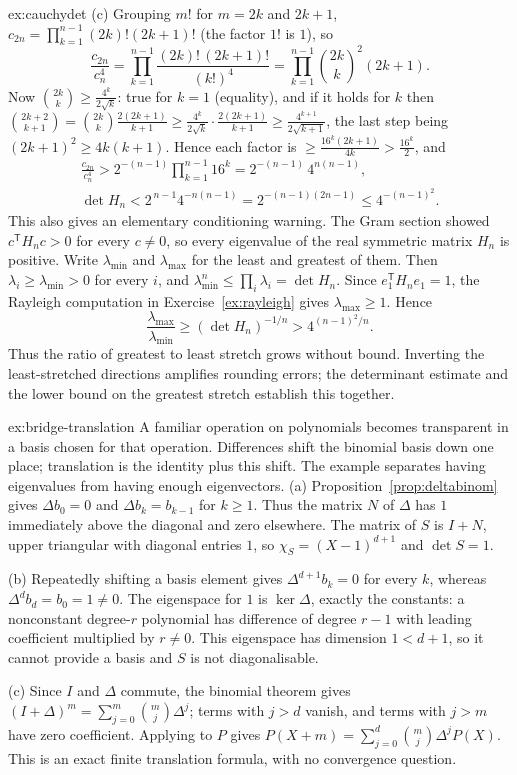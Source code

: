 \begin{solution}{ex:cauchydet}
(c) Grouping $m!$ for $m=2k$ and $2k+1$, $c_{2n}=\prod_{k=1}^{n-1}(2k)!(2k+1)!$ (the factor $1!$ is $1$), so
\[
\frac{c_{2n}}{c_n^4}=\prod_{k=1}^{n-1}\frac{(2k)!\,(2k+1)!}{(k!)^4}=\prod_{k=1}^{n-1}\binom{2k}k^2(2k+1).
\]
Now $\binom{2k}k\ge\frac{4^k}{2\sqrt k}$: true for $k=1$ (equality), and if it holds for $k$ then $\binom{2k+2}{k+1}=\binom{2k}k\frac{2(2k+1)}{k+1}\ge\frac{4^k}{2\sqrt k}\cdot\frac{2(2k+1)}{k+1}\ge\frac{4^{k+1}}{2\sqrt{k+1}}$, the last step being $(2k+1)^2\ge4k(k+1)$. Hence each factor is $\ge\frac{16^k(2k+1)}{4k}>\frac{16^k}2$, and
\[
\begin{gathered}
\frac{c_{2n}}{c_n^4}>2^{-(n-1)}\prod_{k=1}^{n-1}16^k=2^{-(n-1)}\,4^{n(n-1)},\\
\det H_n<2^{\,n-1}4^{-n(n-1)}=2^{-(n-1)(2n-1)}\le4^{-(n-1)^2}.
\end{gathered}
\]
This also gives an elementary conditioning warning. The Gram section showed $c^{\mathsf T}H_nc>0$ for every $c\ne0$, so every eigenvalue of the real symmetric matrix $H_n$ is positive. Write $\lambda_{\min}$ and $\lambda_{\max}$ for the least and greatest of them. Then $\lambda_i\ge\lambda_{\min}>0$ for every $i$, and $\lambda_{\min}^n\le\prod_i\lambda_i=\det H_n$. Since $e_1^{\mathsf T}H_ne_1=1$, the Rayleigh computation in Exercise~\ref{ex:rayleigh} gives $\lambda_{\max}\ge1$. Hence
\[
\frac{\lambda_{\max}}{\lambda_{\min}}\ge(\det H_n)^{-1/n}>4^{(n-1)^2/n}.
\]
Thus the ratio of greatest to least stretch grows without bound. Inverting the least-stretched directions amplifies rounding errors; the determinant estimate and the lower bound on the greatest stretch establish this together.
\end{solution}

\begin{solution}{ex:bridge-translation}
\idea A familiar operation on polynomials becomes transparent in a basis chosen for that operation. Differences shift the binomial basis down one place; translation is the identity plus this shift. The example separates having eigenvalues from having enough eigenvectors.
\writeup (a) Proposition~\ref{prop:deltabinom} gives $\Delta b_0=0$ and $\Delta b_k=b_{k-1}$ for $k\ge1$. Thus the matrix $N$ of $\Delta$ has $1$ immediately above the diagonal and zero elsewhere. The matrix of $S$ is $I+N$, upper triangular with diagonal entries $1$, so $\chi_S=(X-1)^{d+1}$ and $\det S=1$.

(b) Repeatedly shifting a basis element gives $\Delta^{d+1}b_k=0$ for every $k$, whereas $\Delta^db_d=b_0=1\ne0$. The eigenspace for $1$ is $\ker\Delta$, exactly the constants: a nonconstant degree-$r$ polynomial has difference of degree $r-1$ with leading coefficient multiplied by $r\ne0$. This eigenspace has dimension $1<d+1$, so it cannot provide a basis and $S$ is not diagonalisable.

(c) Since $I$ and $\Delta$ commute, the binomial theorem gives $(I+\Delta)^m=\sum_{j=0}^m\binom mj\Delta^j$; terms with $j>d$ vanish, and terms with $j>m$ have zero coefficient. Applying to $P$ gives $P(X+m)=\sum_{j=0}^d\binom mj\Delta^jP(X)$. This is an exact finite translation formula, with no convergence question.
\end{solution}

